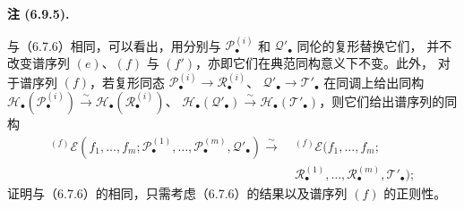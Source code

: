\documentclass[UTF8,fontset=none,11pt,oneside,openany]{ctexbook}
\newenvironment{remark}[1][]{%
  \par\medskip\noindent\textbf{注 (#1).}\ %
}{\par}
\begin{document}
\begin{remark}[6.9.5]
与（6.7.6）相同，可以看出，用分别与
$\mathscr P_\bullet^{(i)}$ 和 $\mathscr Q'_\bullet$ 同伦的复形替换它们，
并不改变谱序列 $(e)$、$(f)$ 与 $(f')$，亦即它们在典范同构意义下不变。此外，
对于谱序列 $(f)$，若复形同态
$\mathscr P_\bullet^{(i)}\to\mathscr R_\bullet^{(i)}$、
$\mathscr Q'_\bullet\to\mathscr T'_\bullet$ 在同调上给出同构
$\mathscr H_\bullet(\mathscr P_\bullet^{(i)})\xrightarrow{\sim}
\mathscr H_\bullet(\mathscr R_\bullet^{(i)})$、
$\mathscr H_\bullet(\mathscr Q'_\bullet)\xrightarrow{\sim}
\mathscr H_\bullet(\mathscr T'_\bullet)$，则它们给出谱序列的同构
\[
\begin{split}
  {}^{(f)}\mathscr E
  (f_1,\ldots,f_m;
   \mathscr P_\bullet^{(1)},\ldots,\mathscr P_\bullet^{(m)},
   \mathscr Q'_\bullet)
  \xrightarrow{\sim}\;&
  {}^{(f)}\mathscr E
  (f_1,\ldots,f_m;\\
  &\mathscr R_\bullet^{(1)},\ldots,\mathscr R_\bullet^{(m)},
   \mathscr T'_\bullet);
\end{split}
\]
证明与（6.7.6）的相同，只需考虑（6.7.6）的结果以及谱序列 $(f)$ 的正则性。
\end{remark}
\end{document}

